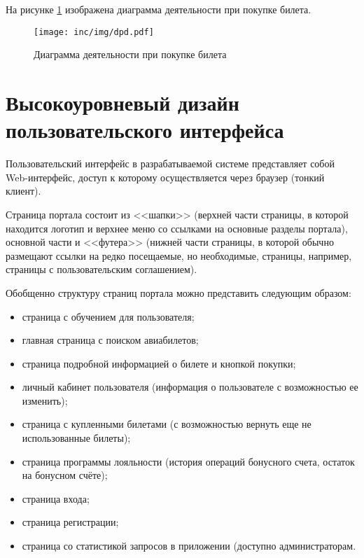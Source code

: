 На рисунке \ref{img:dpd} изображена диаграмма деятельности при покупке билета. 

\begin{figure}[h!]
  \centering
  \texttt{[image: inc/img/dpd.pdf]}
  \caption{Диаграмма деятельности при покупке билета}
  \label{img:dpd}
\end{figure}

\newpage
\section{Высокоуровневый дизайн пользовательского интерфейса}

Пользовательский интерфейс в разрабатываемой системе представляет собой Web-интерфейс, доступ к которому осуществляется через браузер (тонкий клиент).

Страница портала состоит из <<шапки>> (верхней части страницы, в которой находится логотип и верхнее меню со ссылками на основные разделы портала), основной части и <<футера>> (нижней части страницы, в которой обычно размещают ссылки на редко посещаемые, но необходимые, страницы, например, страницы с пользовательским соглашением).

Обобщенно структуру страниц портала можно представить следующим образом:
\begin{itemize}
    \item страница с обучением для пользователя;
    \item главная страница с поиском авиабилетов;
    \item страница подробной информацией о билете и кнопкой покупки;
    \item личный кабинет пользователя (информация о пользователе с возможностью ее изменить);
    \item страница с купленными билетами (с возможностью вернуть еще не использованные билеты);
    \item страница программы лояльности (история операций бонусного счета, остаток на бонусном счёте);
    \item страница входа;
    \item страница регистрации;
    \item страница со статистикой запросов в приложении (доступно администраторам.
\end{itemize}

